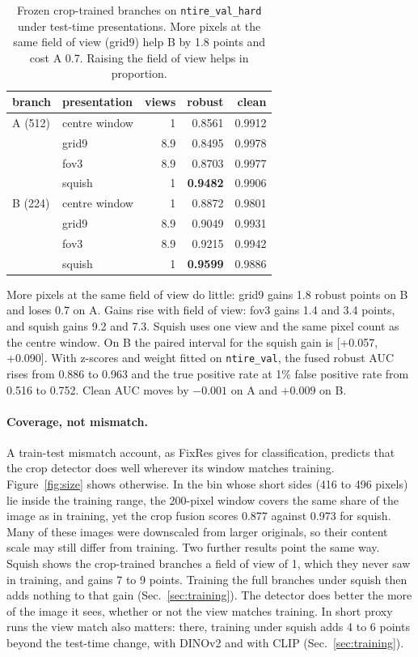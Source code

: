 \documentclass[letterpaper]{article} %
\begin{document}
\begin{table}[t]
\centering
\small
\setlength{\tabcolsep}{4pt}
\begin{tabular}{llrrr}
\toprule
branch & presentation & views & robust & clean \\
\midrule
A (512) & centre window & 1 & 0.8561 & 0.9912 \\
        & grid9 & 8.9 & 0.8495 & 0.9978 \\
        & fov3 & 8.9 & 0.8703 & 0.9977 \\
        & squish & 1 & \textbf{0.9482} & 0.9906 \\
\midrule
B (224) & centre window & 1 & 0.8872 & 0.9801 \\
        & grid9 & 8.9 & 0.9049 & 0.9931 \\
        & fov3 & 8.9 & 0.9215 & 0.9942 \\
        & squish & 1 & \textbf{0.9599} & 0.9886 \\
\bottomrule
\end{tabular}
\caption{Frozen crop-trained branches on \texttt{ntire\_val\_hard} under
test-time presentations. More pixels at the same field of view (grid9) help B
by 1.8 points and cost A 0.7. Raising the field of view helps in proportion.}
\label{tab:probe}
\end{table}

More pixels at the same field of view do little: grid9 gains 1.8 robust
points on B and loses 0.7 on A. Gains rise with field of view: fov3 gains 1.4
and 3.4 points, and squish gains 9.2 and 7.3. Squish uses one view and the
same pixel count as the centre window. On B the paired interval for the
squish gain is [+0.057, +0.090]. With z-scores and weight fitted on
\texttt{ntire\_val}, the fused robust AUC rises from 0.886 to 0.963 and the
true positive rate at 1\% false positive rate from 0.516 to 0.752. Clean AUC
moves by $-0.001$ on A and $+0.009$ on B.

\paragraph{Coverage, not mismatch.} A train-test mismatch account, as FixRes
gives for classification, predicts that the crop detector does well wherever
its window matches training. Figure~\ref{fig:size} shows otherwise. In the bin
whose short sides (416 to 496 pixels) lie inside the training range, the
200-pixel window covers the same share of the image as in training, yet the
crop fusion scores 0.877 against 0.973 for squish. Many of these images were
downscaled from larger originals, so their content scale may still differ
from training. Two further results point the same way. Squish shows the
crop-trained branches a field of view of 1, which they never saw in training,
and gains 7 to 9 points. Training the full branches under squish then adds
nothing to that gain (Sec.~\ref{sec:training}). The detector does better the
more of the image it sees, whether or not the view matches training. In
short proxy runs the view match also matters: there, training under squish
adds 4 to 6 points beyond the test-time change, with DINOv2 and with CLIP
(Sec.~\ref{sec:training}).
\end{document}
